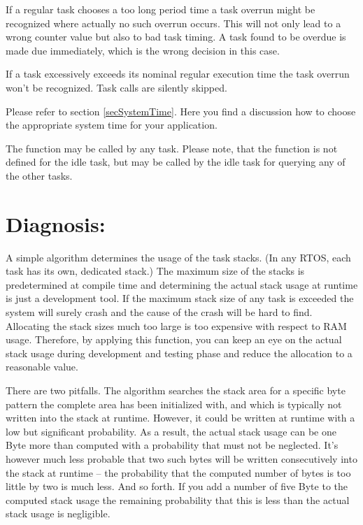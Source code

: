 If a regular task chooses a too long period time a task overrun might be
recognized where actually no such overrun occurs. This will not only lead
to a wrong counter value but also to bad task timing. A task found to be
overdue is made due immediately, which is the wrong decision in this
case.

If a task excessively exceeds its nominal regular execution time the task
overrun won't be recognized. Task calls are silently skipped.

Please refer to section \ref{secSystemTime}. Here you find a discussion
how to choose the appropriate system time for your application.

The function  may be called by any
task. Please note, that the function is not defined for the idle task, but
may be called by the idle task for querying any of the other tasks.


\section{Diagnosis: }

A simple algorithm determines the usage of the task stacks. (In any RTOS,
each task has its own, dedicated stack.) The maximum size of the stacks is
predetermined at compile time and determining the actual stack usage at
runtime is just a development tool. If the maximum stack size of any task
is exceeded the system will surely crash and the cause of the crash will
be hard to find. Allocating the stack sizes much too large is too
expensive with respect to RAM usage. Therefore, by applying this function,
you can keep an eye on the actual stack usage during development and
testing phase and reduce the allocation to a reasonable value.

There are two pitfalls. The algorithm searches the stack area for a
specific byte pattern the complete area has been initialized with, and
which is typically not written into the stack at runtime. However, it
could be written at runtime with a low but significant probability. As a
result, the actual stack usage can be one Byte more than computed with a
probability that must not be neglected. It's however much less probable
that two such bytes will be written consecutively into the stack at
runtime -- the probability that the computed number of bytes is too little
by two is much less. And so forth. If you add a number of five Byte to the
computed stack usage the remaining probability that this is less than the
actual stack usage is negligible.

